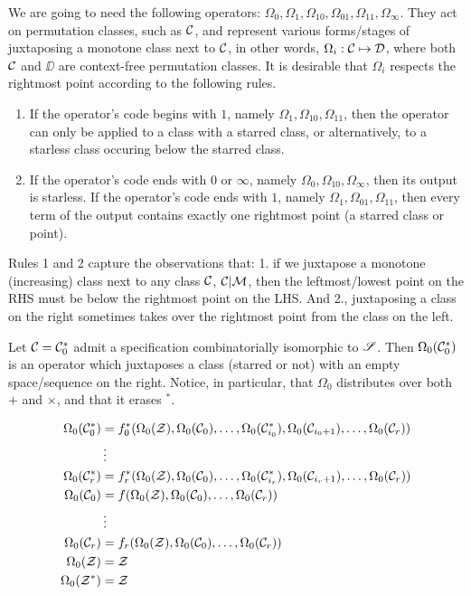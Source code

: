 \documentclass[12pt, a4paper, twoside]{report}
\begin{document}
We are going to need the following operators: $\Omega_0, \Omega_1, \Omega_{10}, \Omega_{01}, \Omega_{11}, \Omega_\infty$. They act on permutation classes, such as $\mathcal{C}$, and represent various forms/stages of juxtaposing a monotone class next to $\mathcal{C}$, in other words, $\Omega_i: \mathcal{C} \mapsto \mathcal{D}$, where both $\mathcal{C}$ and $\DD$ are context-free permutation classes. It is desirable that $\Omega_i$ respects the rightmost point according to the following rules.
\begin{enumerate}
\item If the operator's code begins with $1$, namely $\Omega_1,\Omega_{10},\Omega_{11}$, then the operator can only be applied to a class with a starred class, or alternatively, to a starless class occuring below the starred class.
\item If the operator's code ends with $0$ or $\infty$, namely $\Omega_0, \Omega_{10}, \Omega_\infty$, then its output is starless. If the operator's code ends with $1$, namely $\Omega_1, \Omega_{01}, \Omega_{11}$, then every term of the output contains exactly one rightmost point (a starred class or point).
\end{enumerate}
Rules 1 and 2 capture the observations that: 1. if we juxtapose a monotone (increasing) class next to any class $\mathcal{C}$, $\mathcal{C}|\mathcal{M}$, then the leftmost/lowest point on the RHS must be below the rightmost point on the LHS. And 2., juxtaposing a class on the right sometimes takes over the rightmost point from the class on the left.

Let $\mathcal{C} = \mathcal{C}_0^*$ admit a specification combinatorially isomorphic to $\mathscr{S}$. Then $\Omega_0(\mathcal{C}_0^*)$ is an operator which juxtaposes a class (starred or not) with an empty space/sequence on the right. Notice, in particular, that $\Omega_0$ distributes over both $+$ and $\times$, and that it erases ${}^*$. 

\begin{align*}
  \Omega_0(\mathcal{C}_0^*) &= f_0^*(\Omega_0(\mathcal{Z}),\Omega_0(\mathcal{C}_0),\ldots,\Omega_0(\mathcal{C}_{i_0}^*),\Omega_0(\mathcal{C}_{i_0+1}),\ldots,\Omega_0(\mathcal{C}_r))\\
       &\vdots\\
  \Omega_0(\mathcal{C}_r^*) &= f_r^*(\Omega_0(\mathcal{Z}),\Omega_0(\mathcal{C}_0),\ldots,\Omega_0(\mathcal{C}_{i_r}^*),\Omega_0(\mathcal{C}_{i_r+1}),\ldots,\Omega_0(\mathcal{C}_r))\\
  \Omega_0(\mathcal{C}_0) &= f(\Omega_0(\mathcal{Z}),\Omega_0(\mathcal{C}_0),\ldots,\Omega_0(\mathcal{C}_r))\\
       &\vdots\\
  \Omega_0(\mathcal{C}_r) &= f_r(\Omega_0(\mathcal{Z}),\Omega_0(\mathcal{C}_0),\ldots,\Omega_0(\mathcal{C}_r))\\
  \Omega_0(\mathcal{Z}) &= \mathcal{Z}\\
  \Omega_0(\mathcal{Z}^*) &= \mathcal{Z}
\end{align*}
\end{document}
